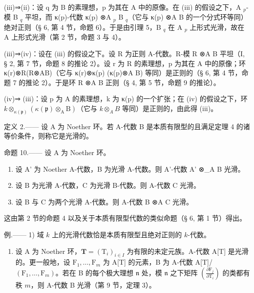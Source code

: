 (iii)⇒(ii)：设 q 为 B 的素理想，p 为其在 A 中的原像。在 (iii) 的假设之下，A \(_{p}\)-模 B \(_{q}\) 平坦，而 κ(p)-代数 κ(p) ⊗A \(_{p}\) B \(_{q}\)（它与 κ(p) ⊗A B 的一个分式环等同）绝对正则（§ 6, 第 4 节，命题 6）。于是由引理 5，B \(_{q}\) 在 A \(_{p}\) 上形式光滑，故在 A 上形式光滑（第 2 节，命题 3 与 4）。

(iii)⇒(iv)：设在 (iii) 的假设之下。设 R 为正则 A-代数。R-模 R ⊗A B 平坦（I, § 2, 第 7 节，命题 8 的推论 2）。设 r 为 R 的素理想，p 为其在 A 中的原像；环 κ(r)⊗R(R⊗AB)（它与 κ(r)⊗κ(p) (κ(p)⊗A B) 等同）是正则的（§ 6, 第 4 节，命题 7 的推论 2）。于是环 R ⊗A B 正则（§ 4, 第 5 节，命题 9 的推论）。

(iv)⇒ (iii)：设 p 为 A 的素理想，k 为 κ(p) 的一个扩张；在 (iv) 的假设之下，环 \(k \otimes_{\kappa(\mathfrak{p})} (\kappa(\mathfrak{p}) \otimes_{\mathrm{A}} \mathrm{B})\)（它与 \(k \otimes_{A} B\) 等同）是正则的，由此得 (iii)。

定义 2.—— 设 A 为 Noether 环。若 A-代数 B 是本质有限型的且满足定理 4 的诸等价条件，则称它是光滑的。

命题 10.—— 设 A 为 Noether 环。

\begin{enumerate}
\def\labelenumi{\alph{enumi})}
\item
  设 A' 为 Noether A-代数，B 为光滑 A-代数。则 A'-代数 A' ⊗\_A B 光滑。
\item
  设 B 为光滑 A-代数，C 为光滑 B-代数。则 A-代数 C 光滑。
\item
  设 B 与 C 为两个光滑 A-代数。则 A-代数 B ⊗A C 光滑。
\end{enumerate}

这由第 2 节的命题 4 以及关于本质有限型代数的类似命题（§ 6, 第 1 节）得出。

例.—— 1) 域 \(k\) 上的光滑代数恰是本质有限型且绝对正则的 \(k\)-代数。

\begin{enumerate}
\def\labelenumi{\arabic{enumi})}
\setcounter{enumi}{1}
\tightlist
\item
  设 A 为 Noether 环，\(\mathbf{T} = (\mathrm{T}_i)_{i\in I}\) 为有限的未定元族。A-代数 A{[}T{]} 是光滑的。更一般地，设 \(\mathrm{F}_1,\ldots ,\mathrm{F}_m\) 为 A{[}T{]} 的元素，B 为 A-代数 A{[}T{]}/ \((\mathrm{F}_1,\dots ,\mathrm{F}_m)\)。若在 B 的每个极大理想 \(\mathfrak{n}\) 处，模 \(\mathfrak{n}\) 之下矩阵 \(\left(\frac{\partial\mathrm{F}_j}{\partial\mathrm{T}_i}\right)\) 的类都有秩 \(m\)，则 A-代数 B 光滑（第 9 节，定理 3）。
\end{enumerate}

